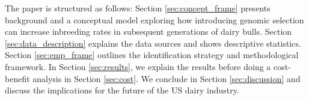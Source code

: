 \documentclass[12pt,letterpaper]{article}
\begin{document}

The paper is structured as follows: Section \ref{sec:concept_frame} presents background and a conceptual model exploring how introducing genomic selection can increase inbreeding rates in subsequent generations of dairy bulls. Section \ref{sec:data_description} explains the data sources and shows descriptive statistics. Section \ref{sec:emp_frame} outlines the identification strategy and methodological framework. In Section \ref{sec:results}, we explain the results before doing a cost-benefit analysis in Section \ref{sec:cost}. We conclude in Section \ref{sec:discussion} and discuss the implications for the future of the US dairy industry.


\end{document}
